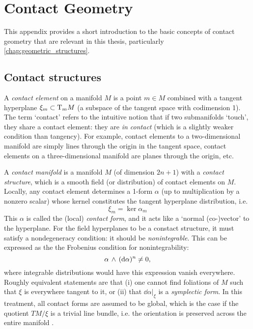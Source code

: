 \chapter{Contact Geometry}
\label{app:contact_geometry}
This appendix provides a short introduction to the basic concepts of contact geometry that are relevant in this thesis, particularly \cref{chap:geometric_structures}.

\section{Contact structures}
\label{sec:contact_structures}
A \emph{contact element} on a manifold $M$ is a point $m \in M$ combined with a tangent hyperplane $\xi_m \subset \mathrm{T}_{m} M$ (a subspace of the tangent space  with codimension 1). The term `contact' refers to the intuitive notion that if two submanifolds `touch', they share a contact element: they are \emph{in contact} (which is a slightly weaker condition than tangency). \cite{Cannas2001} For example, contact elements to a two-dimensional manifold are simply lines through the origin in the tangent space, contact elements on a three-dimensional manifold are planes through the origin, etc.

A \emph{contact manifold} is a manifold $M$ (of dimension $2n+1$) with a \emph{contact structure}, which is a smooth field (or distribution) of contact elements on $M$. Locally, any contact element determines a 1-form $\alpha$ (up to multiplication by a nonzero scalar) whose kernel constitutes the tangent hyperplane distribution, i.e. 
\begin{equation}
    \xi_m = \ker \alpha_m
    \label{eq:contact_form}
\end{equation}
This $\alpha$ is called the (local) \emph{contact form}, and it acts like a `normal (co-)vector' to the hyperplane. For the field hyperplanes to be a constact structure, it must satisfy a nondegeneracy condition: it should be \emph{nonintegrable}. This can be expressed as the the Frobenius condition for nonintegrability: \cite{Cannas2001,Abraham1978,Arnold1989}
$$  \alpha\,\wedge\,(\dd{\alpha})^n  \neq 0, $$
where integrable distributions would have this expression vanish everywhere. Roughly equivalent statements are that (i) one cannot find foliations of $M$ such that $\xi$ is everywhere tangent to it, or (ii) that $\dd{\alpha}\vert_\xi$ is a \emph{symplectic form}. In this treatment, all contact forms are assumed to be global, which is the case if the quotient $TM/\xi$ is a trivial line bundle, i.e. the orientation is preserved across the entire manifold \cite{Geiges2008}.


